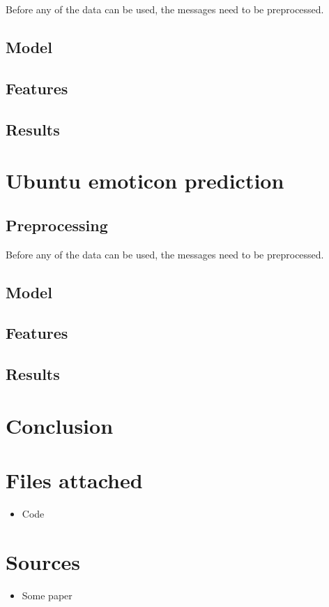 \documentclass{article}
\begin{document}
Before any of the data can be used, the messages need to be preprocessed. 


\subsection*{Model}

\subsection*{Features}

\subsection*{Results}

\pagebreak

\section*{Ubuntu emoticon prediction}

\subsection*{Preprocessing}

Before any of the data can be used, the messages need to be preprocessed. 

\subsection*{Model}

\subsection*{Features}


\subsection*{Results}

\pagebreak

\section*{Conclusion}

\section*{Files attached}
\begin{itemize}
\item Code
\end{itemize}

\section*{Sources}

\begin{itemize}

\item Some paper
\end{itemize}
\end{document}

